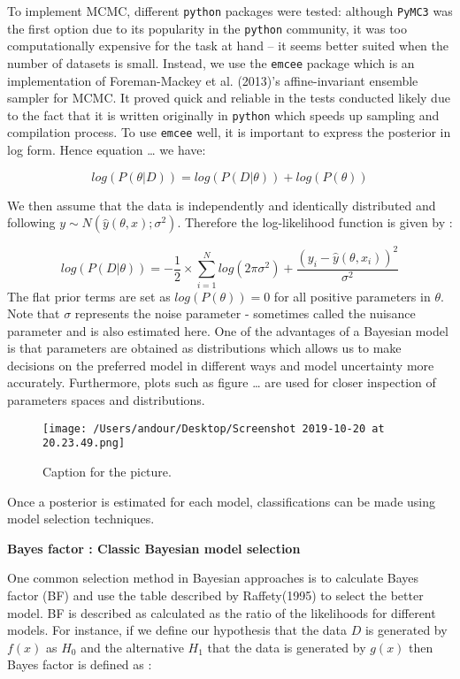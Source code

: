 \documentclass[]{article}
\begin{document}
To implement MCMC, different \texttt{python} packages were tested:
although \texttt{PyMC3} was the first option due to its popularity in
the \texttt{python} community, it was too computationally expensive for
the task at hand -- it seems better suited when the number of datasets
is small. Instead, we use the \texttt{emcee} package which is an
implementation of Foreman-Mackey et al. (2013)'s affine-invariant
ensemble sampler for MCMC. It proved quick and reliable in the tests
conducted likely due to the fact that it is written originally in
\texttt{python} which speeds up sampling and compilation process. To use
\texttt{emcee} well, it is important to express the posterior in log
form. Hence equation \ldots{} we have:

\[log(P(\theta|D)) = log(P(D|\theta)) + log(P(\theta)) \]

We then assume that the data is independently and identically
distributed and following \(y \sim N(\hat y(\theta,x);\sigma^2)\).
Therefore the log-likelihood function is given by :

\[ log(P(D|\theta)) = -\frac {1} {2} \times  \sum_{i=1}^N log(2\pi\sigma^2) + \frac {(y_i - \hat y(\theta,x_i))^2} {\sigma^2}\]
The flat prior terms are set as \(log(P(\theta)) = 0\) for all positive
parameters in \(\theta\). Note that \(\sigma\) represents the noise
parameter - sometimes called the nuisance parameter and is also
estimated here. One of the advantages of a Bayesian model is that
parameters are obtained as distributions which allows us to make
decisions on the preferred model in different ways and model uncertainty
more accurately. Furthermore, plots such as figure \ldots{} are used for
closer inspection of parameters spaces and distributions.

\begin{figure}
\centering
\texttt{[image: /Users/andour/Desktop/Screenshot 2019-10-20 at 20.23.49.png]}
\caption{Caption for the picture.}
\end{figure}

Once a posterior is estimated for each model, classifications can be
made using model selection techniques.

\textbf{Bayes factor : Classic Bayesian model selection}

One common selection method in Bayesian approaches is to calculate Bayes
factor (BF) and use the table described by Raffety(1995) to select the
better model. BF is described as calculated as the ratio of the
likelihoods for different models. For instance, if we define our
hypothesis that the data \(D\) is generated by \(f(x)\) as \(H_0\) and
the alternative \(H_1\) that the data is generated by \(g(x)\) then
Bayes factor is defined as :
\end{document}
